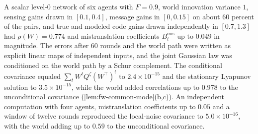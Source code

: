 \begin{numcheck}\label{chk:fw-common-mode}
A scalar level-0 network of six agents with $F=0.9$, world innovation variance $1$, sensing gains drawn in $[0.1,0.4]$, message gains in $[0,0.15]$ on about 60 percent of the pairs, and true and modeled code gains drawn independently in $[0.7,1.3]$ had $\rho(W)=0.774$ and mistranslation coefficients $B^{\mathrm{mis}}_i$ up to $0.049$ in magnitude. The errors after 60 rounds and the world path were written as explicit linear maps of independent inputs, and the joint Gaussian law was conditioned on the world path by a Schur complement. The conditional covariance equaled $\sum_tW^tQ^\zeta(W^\top)^t$ to $2.4\times10^{-15}$ and the stationary Lyapunov solution to $3.5\times10^{-15}$, while the world added correlations up to $0.978$ to the unconditional covariance (\cref{lem:fw-common-mode}(b,c)). An independent computation with four agents, mistranslation coefficients up to $0.05$ and a window of twelve rounds reproduced the local-noise covariance to $5.0\times10^{-16}$, with the world adding up to $0.59$ to the unconditional covariance.
\end{numcheck}
